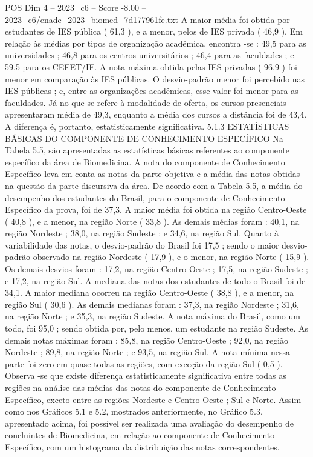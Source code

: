 \begin{textsample}{POS Dim 4 – 2023\_c6 – Score -8.00 – 2023\_c6/enade\_2023\_biomed\_7d177961fe.txt}
A maior média foi obtida por estudantes de IES pública ( 61,3 ), e a menor, pelos de IES privada ( 46,9 ).
Em relação às médias por tipos de organização acadêmica, encontra -se : 49,5 para as universidades ; 46,8 para os centros universitários ; 46,4 para as faculdades ; e 59,5 para os CEFET/IF.
A nota máxima obtida pelas IES privadas ( 96,9 ) foi menor em comparação às IES públicas.
O desvio-padrão menor foi percebido nas IES públicas ; e, entre as organizações acadêmicas, esse valor foi menor para as faculdades.
Já no que se refere à modalidade de oferta, os cursos presenciais apresentaram média de 49,3, enquanto a média dos cursos a distância foi de 43,4.
A diferença é, portanto, estatisticamente significativa. 5.1.3 ESTATÍSTICAS BÁSICAS DO COMPONENTE DE CONHECIMENTO ESPECÍFICO Na Tabela 5.5, são apresentadas as estatísticas básicas referentes ao componente específico da área de Biomedicina.
A nota do componente de Conhecimento Específico leva em conta as notas da parte objetiva e a média das notas obtidas na questão da parte discursiva da área.
De acordo com a Tabela 5.5, a média do desempenho dos estudantes do Brasil, para o componente de Conhecimento Específico da prova, foi de 37,3.
A maior média foi obtida na região Centro-Oeste ( 40,8 ), e a menor, na região Norte ( 33,8 ).
As demais médias foram : 40,1, na região Nordeste ; 38,0, na região Sudeste ; e 34,6, na região Sul.
Quanto à variabilidade das notas, o desvio-padrão do Brasil foi 17,5 ; sendo o maior desvio-padrão observado na região Nordeste ( 17,9 ), e o menor, na região Norte ( 15,9 ).
Os demais desvios foram : 17,2, na região Centro-Oeste ; 17,5, na região Sudeste ; e 17,2, na região Sul.
A mediana das notas dos estudantes de todo o Brasil foi de 34,1.
A maior mediana ocorreu na região Centro-Oeste ( 38,8 ), e a menor, na região Sul ( 30,6 ).
As demais medianas foram : 37,3, na região Nordeste ; 31,6, na região Norte ; e 35,3, na região Sudeste.
A nota máxima do Brasil, como um todo, foi 95,0 ; sendo obtida por, pelo menos, um estudante na região Sudeste.
As demais notas máximas foram : 85,8, na região Centro-Oeste ; 92,0, na região Nordeste ; 89,8, na região Norte ; e 93,5, na região Sul.
A nota mínima nessa parte foi zero em quase todas as regiões, com exceção da região Sul ( 0,5 ).
Observa -se que existe diferença estatisticamente significativa entre todas as regiões na análise das médias das notas do componente de Conhecimento Específico, exceto entre as regiões Nordeste e Centro-Oeste ; Sul e Norte.
Assim como nos Gráficos 5.1 e 5.2, mostrados anteriormente, no Gráfico 5.3, apresentado acima, foi possível ser realizada uma avaliação do desempenho de concluintes de Biomedicina, em relação ao componente de Conhecimento Específico, com um histograma da distribuição das notas correspondentes.

\end{textsample}
